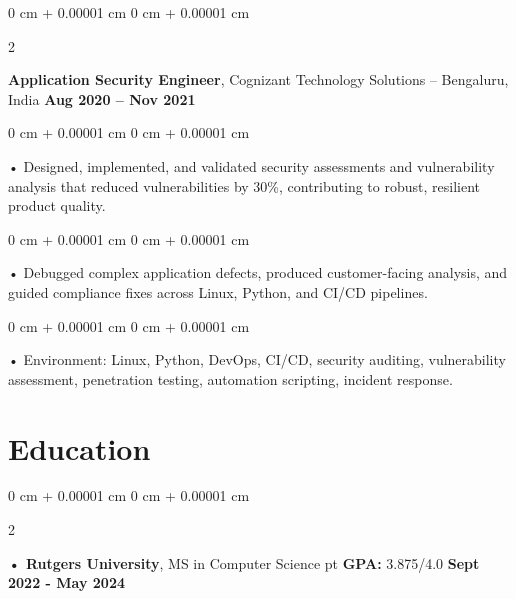 \documentclass[10pt, letterpaper]{article}
\newenvironment{onecolentry}{
    \begin{adjustwidth}{
        0 cm + 0.00001 cm
    }{
        0 cm + 0.00001 cm
    }
}{
    \end{adjustwidth}
} %
\newenvironment{twocolentry}[2][]{
    \onecolentry
    \def\secondColumn{#2}
    \setcolumnwidth{\fill, 4.5 cm}
    \begin{paracol}{2}
}{
    \switchcolumn \raggedleft \secondColumn
    \end{paracol}
    \endonecolentry
} %
\begin{document}
        \begin{twocolentry}{
            \textbf{Aug 2020 – Nov 2021}
        }
            \vspace{2 pt }
            \textbf{Application Security Engineer}, Cognizant Technology Solutions -- Bengaluru, India\end{twocolentry}
        \begin{onecolentry}
             • Designed, implemented, and validated security assessments and vulnerability analysis that reduced vulnerabilities by 30\%, contributing to robust, resilient product quality.
        \end{onecolentry}
        \begin{onecolentry}
             • Debugged complex application defects, produced customer-facing analysis, and guided compliance fixes across Linux, Python, and CI/CD pipelines.
        \end{onecolentry}

        \begin{onecolentry}
             • Environment: Linux, Python, DevOps, CI/CD, security auditing, vulnerability assessment, penetration testing, automation scripting, incident response.
        \end{onecolentry}
    \vspace{2 pt }
        \section{Education}
        \vspace{2 pt }
        \begin{twocolentry}{
            \textbf{Sept 2022 - May 2024}
        }
            \textbf{ • Rutgers University}, MS in Computer Science  pt \textbf{GPA:} 3.875/4.0  \end{twocolentry}
\end{document}
